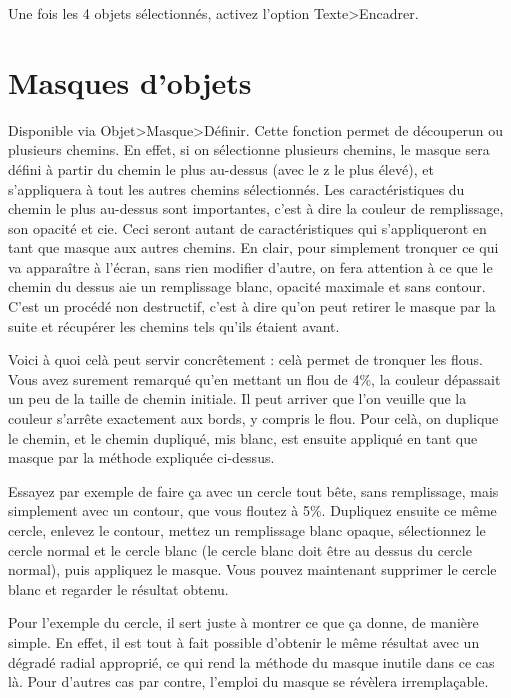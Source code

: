\documentclass[a4paper,twoside]{article}
\begin{document}
Une fois les 4 objets sélectionnés, activez l'option Texte>Encadrer.


\section{Masques d'objets}
Disponible via Objet>Masque>Définir. Cette fonction permet de \og découper\fg un ou plusieurs chemins. En effet, si on sélectionne plusieurs chemins, le masque sera défini à partir du chemin le plus au-dessus (avec le z le plus élevé), et s'appliquera à tout les autres chemins sélectionnés. Les caractéristiques du chemin le plus au-dessus sont importantes, c'est à dire la couleur de remplissage, son opacité et cie. Ceci seront autant de caractéristiques qui s'appliqueront en tant que masque aux autres chemins. En clair, pour simplement tronquer ce qui va apparaître à l'écran, sans rien modifier d'autre, on fera attention à ce que le chemin du dessus aie un remplissage blanc, opacité maximale et sans contour. C'est un procédé non destructif, c'est à dire qu'on peut retirer le masque par la suite et récupérer les chemins tels qu'ils étaient avant.

Voici à quoi celà peut servir concrêtement : celà permet de tronquer les flous. Vous avez surement remarqué qu'en mettant un flou de 4\%, la couleur dépassait un peu de la taille de chemin initiale. Il peut arriver que l'on veuille que la couleur s'arrête exactement aux bords, y compris le flou. Pour celà, on duplique le chemin, et le chemin dupliqué, mis blanc, est ensuite appliqué en tant que masque par la méthode expliquée ci-dessus.

Essayez par exemple de faire ça avec un cercle tout bête, sans remplissage, mais simplement avec un contour, que vous floutez à 5\%. Dupliquez ensuite ce même cercle, enlevez le contour, mettez un remplissage blanc opaque, sélectionnez le cercle normal et le cercle blanc (le cercle blanc doit être au dessus du cercle normal), puis appliquez le masque. Vous pouvez maintenant supprimer le cercle blanc et regarder le résultat obtenu.

\begin{remarque}
Pour l'exemple du cercle, il sert juste à montrer ce que ça donne, de manière simple. En effet, il est tout à fait possible d'obtenir le même résultat avec un dégradé radial approprié, ce qui rend la méthode du masque inutile dans ce cas là. Pour d'autres cas par contre, l'emploi du masque se révèlera irremplaçable.
\end{remarque}
\end{document}
